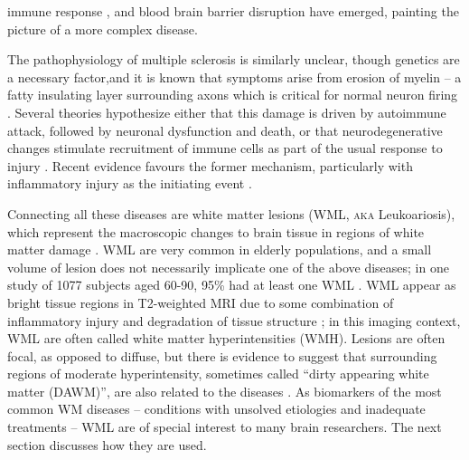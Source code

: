 immune response \cite{Heppner2015},
and blood brain barrier disruption \cite{Bell2009} have emerged,
painting the picture of a more complex disease.
\par
The pathophysiology of multiple sclerosis is similarly unclear,
though genetics are a necessary factor,and it is known that symptoms arise from erosion of myelin 
-- a fatty insulating layer surrounding axons
which is critical for normal neuron firing \cite{Trapp2008}.
Several theories hypothesize either that this damage is driven by
autoimmune attack, followed by neuronal dysfunction and death,
or that neurodegenerative changes stimulate recruitment of immune cells
as part of the usual response to injury \cite{Lucchinetti2000,Trapp2008}.
Recent evidence favours the former mechanism,
particularly with inflammatory injury as the initiating event \cite{Ciccarelli2014,Mahad2015}.
\par
Connecting all these diseases are white matter lesions (WML, \textsc{aka} Leukoariosis),
which represent the macroscopic changes to brain tissue
in regions of white matter damage \cite{Debette2010,Bakshi2005,Wardlaw2015}.
WML are very common in elderly populations,
and a small volume of lesion does not necessarily implicate one of the above diseases;
in one study of 1077 subjects aged 60-90, 95\% had at least one WML \cite{DeLeeuw2001}.
WML appear as bright tissue regions in T2-weighted MRI due to some combination of
inflammatory injury and degradation of tissue structure \cite{Bakshi2005,Wardlaw2015};
in this imaging context, WML are often called white matter hyperintensities (WMH).
Lesions are often focal, as opposed to diffuse, but there is evidence to suggest that
surrounding regions of moderate hyperintensity,
sometimes called ``dirty appearing white matter (DAWM)'',
are also related to the diseases \cite{Ge2003}.
As biomarkers of the most common WM diseases
-- conditions with unsolved etiologies and inadequate treatments --
WML are of special interest to many brain researchers.
The next section discusses how they are used.

